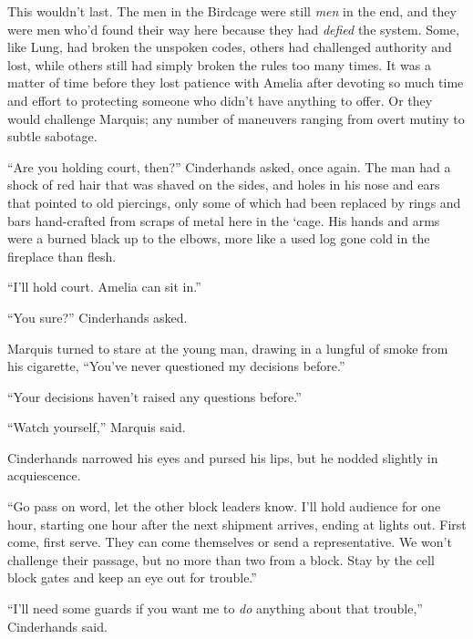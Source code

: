 This wouldn't last.  The men in the Birdcage were still \emph{men} in the end, and they were men who'd found their way here because they had \emph{defied} the system.  Some, like Lung, had broken the unspoken codes, others had challenged authority and lost, while others still had simply broken the rules too many times.  It was a matter of time before they lost patience with Amelia after devoting so much time and effort to protecting someone who didn't have anything to offer.  Or they would challenge Marquis; any number of maneuvers ranging from overt mutiny to subtle sabotage.



``Are you holding court, then?'' Cinderhands asked, once again.  The man had a shock of red hair that was shaved on the sides, and holes in his nose and ears that pointed to old piercings, only some of which had been replaced by rings and bars hand-crafted from scraps of metal here in the `cage.  His hands and arms were a burned black up to the elbows, more like a used log gone cold in the fireplace than flesh.



``I'll hold court.  Amelia can sit in.''



``You sure?'' Cinderhands asked.



Marquis turned to stare at the young man, drawing in a lungful of smoke from his cigarette, ``You've never questioned my decisions before.''



``Your decisions haven't raised any questions before.''



``Watch yourself,'' Marquis said.



Cinderhands narrowed his eyes and pursed his lips, but he nodded slightly in acquiescence.



``Go pass on word, let the other block leaders know.  I'll hold audience for one hour, starting one hour after the next shipment arrives, ending at lights out.  First come, first serve.  They can come themselves or send a representative.  We won't challenge their passage, but no more than two from a block.  Stay by the cell block gates and keep an eye out for trouble.''



``I'll need some guards if you want me to \emph{do} anything about that trouble,'' Cinderhands said.



